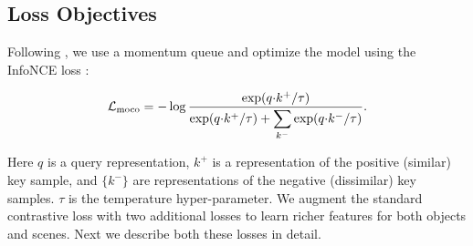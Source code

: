 \subsection{Loss Objectives}

Following \cite{he2019momentum}, we use a momentum queue and optimize the model using the InfoNCE loss :

\begin{equation}
\small
\mathcal{L}_{\text{moco}} = -\log \frac{\exp(q{\cdot}k^+ / \tau)}{\exp(q{\cdot}k^+ / \tau) + {\displaystyle\sum_{k^-}}\exp(q{\cdot}k^-  / \tau)}.
\label{eq:infonce}
\end{equation}

Here $q$ is a query representation, $k^+$ is a representation of the positive (similar) key sample, and $\{k^-\}$ are representations of the negative (dissimilar) key samples. $\tau$ is the temperature hyper-parameter. 
We augment the standard contrastive loss with two additional losses to learn richer features for both objects and scenes. Next we describe both these losses in detail.
